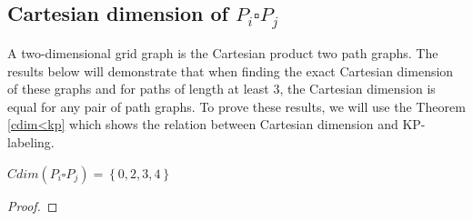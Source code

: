 \documentclass[12pt,a4paper,titlepage,openany]{report}
\begin{document}
\subsection{Cartesian dimension of $P_i\square P_j$}
A two-dimensional grid graph is the Cartesian product two path graphs. The results below will demonstrate that when finding the exact Cartesian dimension of these graphs and for paths of length at least 3, the Cartesian dimension is equal for any pair of path graphs. To prove these results, we will use the Theorem \ref{cdim<kp} which shows the relation between Cartesian dimension and KP-labeling.\newline
\begin{theorem}
$Cdim(P_i \square P_j) = \left\{0,2,3,4\right\}$
\end{theorem}
\begin{proof}


\end{proof}
\end{document}

